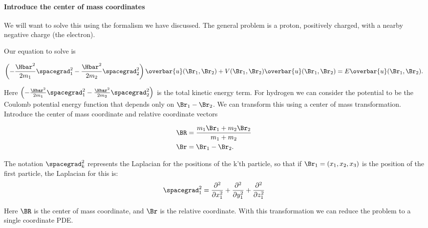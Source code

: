 %
%

\paragraph{Introduce the center of mass coordinates}

We will want to solve this using the formalism we have discussed.  The general problem is a proton, positively charged, with a nearby negative charge (the electron).

Our equation to solve is

\begin{align}\label{eqn:PHY356Lecture10:50}
\left(
-\frac{\Hbar^2}{2 m_1} \spacegrad_1^2
-\frac{\Hbar^2}{2 m_2} \spacegrad_2^2
\right)
\overbar{u}(\Br_1, \Br_2) +
V(\Br_1, \Br_2)
\overbar{u}(\Br_1, \Br_2)
=
E \overbar{u}(\Br_1, \Br_2).
\end{align}

Here \(\left( -\frac{\Hbar^2}{2 m_1} \spacegrad_1^2 -\frac{\Hbar^2}{2 m_2} \spacegrad_2^2 \right)\) is the total kinetic energy term.
For hydrogen we can consider the potential to be the Coulomb potential energy function that depends only on \(\Br_1 - \Br_2\).  We can transform this using a center of mass transformation.  Introduce the center of mass coordinate and relative coordinate vectors

\begin{align}\label{eqn:PHY356Lecture10:51}
\BR &= \frac{m_1 \Br_1 + m_2 \Br_2}{ m_1 + m_2 } \\
\Br &= \Br_1 - \Br_2.
\end{align}

The notation \(\spacegrad_k^2\) represents the Laplacian for the positions of the k'th particle, so that if \(\Br_1 = (x_1, x_2, x_3)\) is the position of the first particle, the Laplacian for this is:
%
\begin{equation}\label{eqn:PHY356FLecture10:52}
\spacegrad_1^2
=
\frac{\partial^2}{\partial x_1^2}
+\frac{\partial^2}{\partial y_1^2}
+\frac{\partial^2}{\partial z_1^2}
\end{equation}

Here \(\BR\) is the center of mass coordinate, and \(\Br\) is the relative coordinate.  With this transformation we can reduce the problem to a single coordinate PDE.

